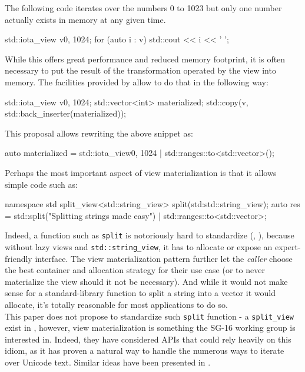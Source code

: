 \documentclass{wg21}
\newcommand{\cc}[1]{\texttt{#1}}
\begin{document}
The following code iterates over the numbers 0 to 1023 but only one number actually exists in memory at any given time.
\begin{codeblock}
std::iota_view v{0, 1024};
for (auto i : v) {
    std::cout << i << ' ';
}
\end{codeblock}

While this offers great performance and reduced memory footprint, it is often necessary to put the result of the transformation operated by the view into memory.
The facilities provided by \cite{P0896R3} allow to do that in the following way:


\begin{codeblock}
    std::iota_view v{0, 1024};
    std::vector<int> materialized;
    std::copy(v, std::back_inserter(materialized));
\end{codeblock}

This proposal allows rewriting the above snippet as:

\begin{codeblock}
    auto materialized = std::iota_view{0, 1024} | std::ranges::to<std::vector>();
\end{codeblock}


Perhaps the most important aspect of view materialization is that it allows simple code such as:

\begin{codeblock}
    namespace std {
        split_view<std::string_view> split(std:std::string_view);
    }
    auto res = std::split("Splitting strings made easy")
    	       | std::ranges::to<std::vector>;
\end{codeblock}

Indeed, a function such as \cc{split} is notoriously hard to standardize (\cite{P0540},  \cite{N3593}), because without lazy views and \cc{std::string_view}, it has to allocate or expose an expert-friendly interface.
The view materialization pattern further let the \emph{caller} choose the best container and allocation strategy for their use case (or to never materialize the view should it not be necessary).
And while it would not make sense for a standard-library function to split a string into a vector it would allocate, it's totally reasonable for most applications to do so.\\

This paper does not propose to standardize such \cc{split} function - a \cc{split_view} exist in \cite{P0896R3}, however, view materialization is something the SG-16 working group is interested in.
Indeed, they have considered APIs that could rely heavily on this idiom, as it has proven a natural way to handle the numerous ways to iterate over Unicode text.
Similar ideas have been presented in \cite{P1004}.
\end{document}
